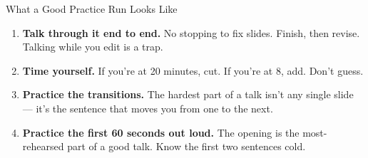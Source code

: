 \begin{frame}{What a Good Practice Run Looks Like}
  \begin{enumerate}
    \item \textbf{Talk through it end to end.} No stopping to fix slides. Finish, then revise. Talking while you edit is a trap.

    \vspace{4pt}

    \item \textbf{Time yourself.} If you're at 20 minutes, cut. If you're at 8, add. Don't guess.

    \vspace{4pt}

    \item \textbf{Practice the transitions.} The hardest part of a talk isn't any single slide --- it's the sentence that moves you from one to the next.

    \vspace{4pt}

    \item \textbf{Practice the first 60 seconds out loud.} The opening is the most-rehearsed part of a good talk. Know the first two sentences cold.
  \end{enumerate}
\end{frame}

